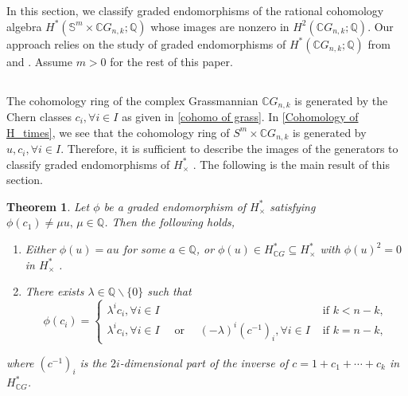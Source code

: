 \documentclass{amsart}
\newtheorem{theorem}{Theorem}[section]
\begin{document}
	In this section, we classify graded endomorphisms of the rational cohomology algebra $ H^*(\mathbb S^m\times \mathbb CG_{n,k}; \mathbb{Q}) $ whose images are nonzero in $H^2(\mathbb CG_{n,k};\mathbb Q)$. Our approach relies on the study of graded endomorphisms of $ H^*(\mathbb{C}G_{n,k}; \mathbb{Q}) $ from \cite{glover-homer} and \cite{hoffman}. Assume $m>0$ for the rest of this paper.
	\subsection{} The cohomology ring of the complex Grassmannian $ \mathbb{C}G_{n,k} $ is generated by the Chern classes $c_i,\forall i \in I $ as given in \eqref{cohomo of grass}. In \eqref{Cohomology of H_times}, we see that the cohomology ring of $S^m \times \mathbb{C}G_{n,k}$ is generated by $u, c_i, \forall i \in I$. Therefore, it is sufficient to describe the images of the generators to classify graded endomorphisms of $H_{\times}^*$%
. The following is %
the main result of this section.
	
	
	
	
	
	
	
	\begin{theorem}\label{main thm}
		Let $\phi$ be a graded endomorphism of $H^*_{\times}$ satisfying $\phi(c_1) \neq \mu u,\, \mu \in \mathbb{Q}$.  
		Then the following %
holds, \begin{enumerate}
			\item Either %
$\phi(u)=au$ for some $a \in \mathbb{Q}$, or $\phi(u) \in H^*_{\mathbb{C}G} \subseteq H^*_{\times}$ with $\phi(u)^2=0$ in $H^*_{\times}$%
.
			\item There %
exists $\lambda \in \mathbb Q\backslash\{0\}$ such that
			$$\phi(c_i) = \begin{cases}
				\lambda^i c_i,   \forall i \in I& \text{ if } k<n-k,\\
				\lambda^i c_i,  \forall i \in I \quad \text{ or } \quad(-\lambda)^i (c^{-1})_i,    \forall i \in I & \text{ if } k= n-k,
			\end{cases}$$
		\end{enumerate} where $ (c^{-1})_i $ is the $ 2i $-dimensional part of the inverse of $ c = 1 + c_1 + \cdots + c_k $ in $ H^*_{ \mathbb CG} $.
	\end{theorem}
	
\end{document}
